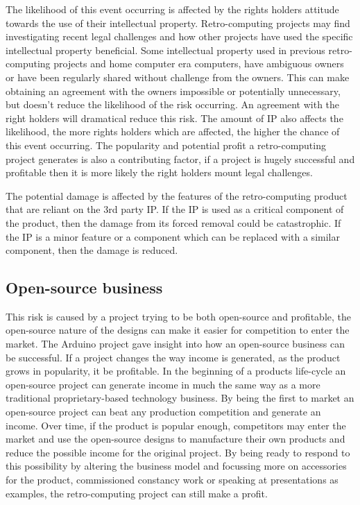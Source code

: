 The likelihood of this event occurring is affected by the rights holders attitude towards the use of their intellectual property. Retro-computing projects may find investigating recent legal challenges and how other projects have used the specific intellectual property beneficial. Some intellectual property used in previous retro-computing projects and home computer era computers, have ambiguous owners or have been regularly shared without challenge from the owners. This can make obtaining an agreement with the owners impossible or potentially unnecessary, but doesn't reduce the likelihood of the risk occurring. An agreement with the right holders will dramatical reduce this risk. The amount of IP also affects the likelihood, the more rights holders which are affected, the higher the chance of this event occurring. The popularity and potential profit a retro-computing project generates is also a contributing factor, if a project is hugely successful and profitable then it is more likely the right holders mount legal challenges.

The potential damage is affected by the features of the retro-computing product that are reliant on the 3rd party IP. If the IP is used as a critical component of the product, then the damage from its forced removal could be catastrophic. If the IP is a minor feature or a component which can be replaced with a similar component, then the damage is reduced.


\subsection{Open-source business}
This risk is caused by a project trying to be both open-source and profitable, the open-source nature of the designs can make it easier for competition to enter the market. The Arduino project gave insight into how an open-source business can be successful. If a project changes the way income is generated, as the product grows in popularity, it be profitable. In the beginning of a products life-cycle an open-source project can generate income in much the same way as a more traditional proprietary-based technology business. By being the first to market an open-source project can beat any production competition and generate an income. Over time, if the product is popular enough, competitors may enter the market and use the open-source designs to manufacture their own products and reduce the possible income for the original project. By being ready to respond to this possibility by altering the business model and focussing more on accessories for the product, commissioned constancy work or speaking at presentations as examples, the retro-computing project can still make a profit.

